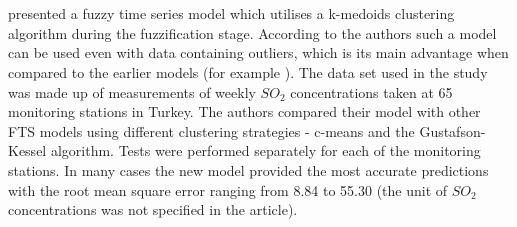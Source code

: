 \\\\
\cite{GULERDINCER2018157} presented a fuzzy time series model which utilises a k-medoids clustering algorithm during the fuzzification stage. According to the authors such a model can be used even with data containing outliers, which is its main advantage when compared to the earlier models (for example \cite{CHENG20112016}). The data set used in the study was made up of measurements of weekly $SO_2$ concentrations taken at 65 monitoring stations in Turkey. The authors compared their model with other FTS models using different clustering strategies - c-means and the Gustafson-Kessel algorithm. Tests were performed separately for each of the monitoring stations. In many cases the new model provided the most accurate predictions with the root mean square error ranging from 8.84 to 55.30 (the unit of $SO_2$ concentrations was not specified in the article).

